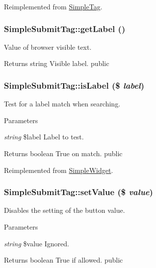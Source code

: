 Reimplemented from \hyperlink{class_simple_tag_a158fcbf8b82e7a6f7b6855c1dbe0715b}{SimpleTag}.\hypertarget{class_simple_submit_tag_a5c392cbc3bd27f267fd4763659745385}{
\subsubsection[{getLabel}]{\setlength{\rightskip}{0pt plus 5cm}SimpleSubmitTag::getLabel ()}}
\label{class_simple_submit_tag_a5c392cbc3bd27f267fd4763659745385}
Value of browser visible text. \begin{DoxyReturn}{Returns}
string Visible label.  public 
\end{DoxyReturn}
\hypertarget{class_simple_submit_tag_ab9604de20ab0d5d86de8603780c5fd61}{
\subsubsection[{isLabel}]{\setlength{\rightskip}{0pt plus 5cm}SimpleSubmitTag::isLabel (\$ {\em label})}}
\label{class_simple_submit_tag_ab9604de20ab0d5d86de8603780c5fd61}
Test for a label match when searching. 
\begin{DoxyParams}{Parameters}
\item[{\em string}]\$label Label to test. \end{DoxyParams}
\begin{DoxyReturn}{Returns}
boolean True on match.  public 
\end{DoxyReturn}


Reimplemented from \hyperlink{class_simple_widget_ab4560f7a1b68df77c3ee34f6bc81dcab}{SimpleWidget}.\hypertarget{class_simple_submit_tag_ac0e27babe9c5af762b7d9135062ebcf6}{
\subsubsection[{setValue}]{\setlength{\rightskip}{0pt plus 5cm}SimpleSubmitTag::setValue (\$ {\em value})}}
\label{class_simple_submit_tag_ac0e27babe9c5af762b7d9135062ebcf6}
Disables the setting of the button value. 
\begin{DoxyParams}{Parameters}
\item[{\em string}]\$value Ignored. \end{DoxyParams}
\begin{DoxyReturn}{Returns}
boolean True if allowed.  public 
\end{DoxyReturn}


